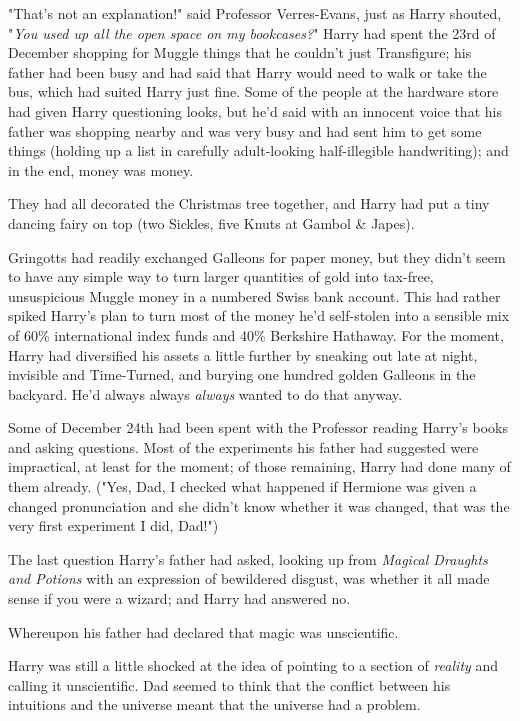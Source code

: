 "That's not an explanation!" said Professor Verres-Evans, just as Harry
shouted, "\emph{You used up all the open space on my bookcases?}"
\sbreak
Harry had spent the 23rd of December shopping for Muggle things that he
couldn't just Transfigure; his father had been busy and had said that Harry
would need to walk or take the bus, which had suited Harry just fine. Some of
the people at the hardware store had given Harry questioning looks, but he'd
said with an innocent voice that his father was shopping nearby and was very
busy and had sent him to get some things (holding up a list in carefully
adult-looking half-illegible handwriting); and in the end, money was money.

They had all decorated the Christmas tree together, and Harry had put a tiny
dancing fairy on top (two Sickles, five Knuts at Gambol \& Japes).

Gringotts had readily exchanged Galleons for paper money, but they didn't seem
to have any simple way to turn larger quantities of gold into tax-free,
unsuspicious Muggle money in a numbered Swiss bank account. This had rather
spiked Harry's plan to turn most of the money he'd self-stolen into a sensible
mix of 60\% international index funds and 40\% Berkshire Hathaway. For the
moment, Harry had diversified his assets a little further by sneaking out late
at night, invisible and Time-Turned, and burying one hundred golden Galleons in
the backyard. He'd always always \emph{always} wanted to do that anyway.

Some of December 24th had been spent with the Professor reading Harry's books
and asking questions. Most of the experiments his father had suggested were
impractical, at least for the moment; of those remaining, Harry had done many
of them already. ("Yes, Dad, I checked what happened if Hermione was given a
changed pronunciation and she didn't know whether it was changed, that was the
very first experiment I did, Dad!")

The last question Harry's father had asked, looking up from \emph{Magical
Draughts and Potions} with an expression of bewildered disgust, was whether it
all made sense if you were a wizard; and Harry had answered no.

Whereupon his father had declared that magic was unscientific.

Harry was still a little shocked at the idea of pointing to a section of
\emph{reality} and calling it unscientific. Dad seemed to think that the
conflict between his intuitions and the universe meant that the universe had a
problem.

